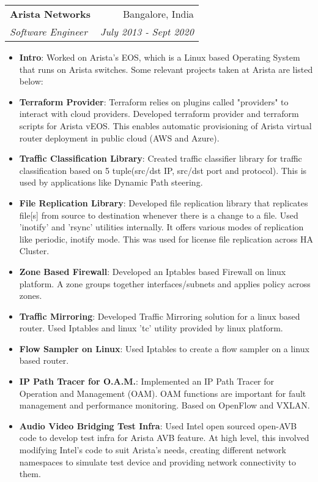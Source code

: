 \documentclass[letterpaper,11pt]{article}
\makeatletter
\newcommand{\resumeItem}[2]{
  \item\small{
    \textbf{#1}{: #2 \vspace{-2pt}}
  }
}
\newcommand{\resumeSubheading}[4]{
  \vspace{-1pt}\item
    \begin{tabular*}{0.97\textwidth}[t]{l@{\extracolsep{\fill}}r}
      \textbf{#1} & #2 \\
      \textit{\small#3} & \textit{\small #4} \\
    \end{tabular*}\vspace{-5pt}
}
\newcommand{\resumeSubSubheading}[2]{
    \begin{tabular*}{0.97\textwidth}{l@{\extracolsep{\fill}}r}
      \textit{\small#1} & \textit{\small #2} \\
    \end{tabular*}\vspace{-5pt}
}
\newcommand{\resumeSubHeadingListEnd}{\end{itemize}}
\newcommand{\resumeItemListStart}{\begin{itemize}}
\newcommand{\resumeItemListEnd}{\end{itemize}\vspace{-5pt}}
\makeatother
\begin{document}

    \resumeSubheading
      {Arista Networks}{Bangalore, India}
      {Software Engineer}{July 2013 - Sept 2020}
      \resumeItemListStart
        \resumeItem{Intro}
          {Worked on Arista’s EOS, which is a Linux based Operating System that runs on Arista switches. Some relevant projects taken at Arista are listed below:}
        \resumeItem{Terraform Provider}
          {Terraform relies on plugins called "providers" to interact with cloud providers. Developed terraform provider and terraform scripts for Arista vEOS. This enables automatic provisioning of Arista virtual router deployment in public cloud (AWS and Azure).}
        \resumeItem{Traffic Classification Library}
          {Created traffic classifier library for traffic classification based on 5 tuple(src/dst IP, src/dst port and protocol). This is used by applications like Dynamic Path steering.}
        \resumeItem{File Replication Library}
          {Developed file replication library that replicates file[s] from source to destination whenever there is a change to a file. Used ’inotify’ and ’rsync’ utilities internally. It offers various modes of replication like periodic, inotify mode. This was used for license file replication across HA Cluster.}
        \resumeItem{Zone Based Firewall}
          {Developed an Iptables based Firewall on linux platform. A zone groups together interfaces/subnets and applies policy across zones.}
        \resumeItem{Traffic Mirroring}
          {Developed Traffic Mirroring solution for a linux based router. Used Iptables and linux ’tc’ utility provided by linux platform.}
        \resumeItem{Flow Sampler on Linux}
          {Used Iptables to create a flow sampler on a linux based router.}
        \resumeItem{IP Path Tracer for O.A.M.}
          {Implemented an IP Path Tracer for Operation and Management (OAM). OAM functions are important for fault management and performance monitoring. Based on OpenFlow and VXLAN.}
        \resumeItem{Audio Video Bridging Test Infra}
          {Used Intel open sourced open-AVB code to develop test infra for Arista AVB feature. At high level, this involved modifying Intel’s code to suit Arista’s needs, creating different network namespaces to simulate test device and providing network connectivity to them.}
      \resumeItemListEnd
\end{document}
